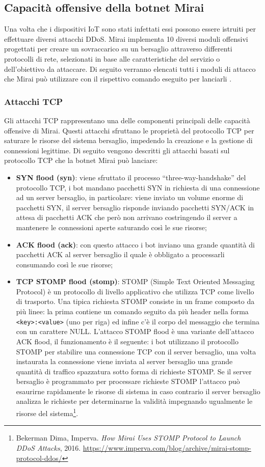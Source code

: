 \subsection{Capacità offensive della botnet Mirai}\label{capacità offensive}
Una volta che i dispositivi IoT sono stati infettati essi possono essere istruiti per effettuare diversi attacchi DDoS. Mirai implementa 10 diversi moduli offensivi progettati per creare un sovraccarico su un bersaglio attraverso differenti protocolli di rete, selezionati in base alle caratteristiche del servizio o dell'obiettivo da attaccare. Di seguito verranno elencati tutti i moduli di attacco che Mirai può utilizzare con il rispettivo comando eseguito per lanciarli \cite{info_attacchi_mirai}.
\subsubsection{Attacchi TCP}
Gli attacchi TCP rappresentano una delle componenti principali delle capacità offensive di Mirai. Questi attacchi sfruttano le proprietà del protocollo TCP per saturare le risorse del sistema bersaglio, impedendo la creazione e la gestione di connessioni legittime. Di seguito vengono descritti gli attacchi basati sul protocollo TCP che la botnet Mirai può lanciare:
\begin{itemize}
    \item \textbf{SYN flood (syn)}: viene sfruttato il processo ``three-way-handshake'' del protocollo TCP, i bot mandano pacchetti SYN in richiesta di una connessione ad un server bersaglio, in particolare: viene inviato un volume enorme di pacchetti SYN, il server bersaglio risponde inviando pacchetti SYN/ACK in attesa di pacchetti ACK che però non arrivano costringendo il server a mantenere le connessioni aperte saturando così le sue risorse;
    \item \textbf{ACK flood (ack)}: con questo attacco i bot inviano una grande quantità di pacchetti ACK al server bersaglio il quale è obbligato a processarli consumando così le sue risorse;
    \item \textbf{TCP STOMP flood (stomp)}: STOMP (Simple Text Oriented Messaging Protocol) è un protocollo di livello applicativo che utilizza TCP come livello di trasporto. Una tipica richiesta STOMP consiste in un frame composto da più linee: la prima contiene un comando seguito da più header nella forma \texttt{<key>:<value>} (uno per riga) ed infine c'è il corpo del messaggio che termina con un carattere NULL. L'attacco STOMP flood è una variante dell'attacco ACK flood, il funzionamento è il seguente: i bot utilizzano il protocollo STOMP per stabilire una connessione TCP con il server bersaglio, una volta instaurata la connessione viene inviata al server bersaglio una grande quantità di traffico spazzatura sotto forma di richieste STOMP. Se il server bersaglio è programmato per processare richieste STOMP l'attacco può esaurirne rapidamente le risorse di sistema in caso contrario  il server bersaglio analizza le richieste per determinarne la validità impegnando ugualmente le risorse del sistema\footnote{Bekerman Dima, Imperva. \emph{How Mirai Uses STOMP Protocol to Launch DDoS Attacks}, 2016. \url{https://www.imperva.com/blog/archive/mirai-stomp-protocol-ddos/}}.
\end{itemize}
